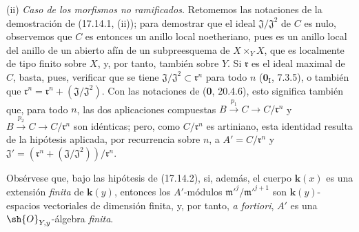 (ii) \emph{Caso de los morfismos no ramificados.} Retomemos las notaciones de la demostración de (17.14.1, (ii)); para demostrar que el ideal $\mathfrak{J}/\mathfrak{J}^2$ de $C$ es nulo, observemos que $C$ es entonces un anillo local noetheriano, pues es un anillo local del anillo de un abierto afín de un subpreesquema de $X\times_YX$, que es localmente de tipo finito sobre $X$, y, por tanto, también sobre $Y$. Si $\mathfrak r$ es el ideal maximal de $C$, basta, pues, verificar que se tiene $\mathfrak{J}/\mathfrak{J}^2\subset\mathfrak r^n$ para todo $n$ ($\mathbf{0}_{\mathrm I}$, 7.3.5), o también que $\mathfrak r^n=\mathfrak r^n+(\mathfrak{J}/\mathfrak{J}^2)$. Con las notaciones de (\textbf 0, 20.4.6), esto significa también que, para todo $n$, las dos aplicaciones compuestas $B\xrightarrow{p_1}C\to C/\mathfrak r^n$ y $B\xrightarrow{p_2}C\to C/\mathfrak r^n$ son idénticas; pero, como $C/\mathfrak r^n$ es artiniano, esta identidad resulta de la hipótesis aplicada, por recurrencia sobre $n$, a $A'=C/\mathfrak r^n$ y $\mathfrak{J}'=(\mathfrak r^n+(\mathfrak{J}/\mathfrak{J}^2))/\mathfrak r^n$.

\begin{remark}[17.14.3]
\label{IV.17.14.3}
Obsérvese que, bajo las hipótesis de (17.14.2), si, además, el cuerpo $\boldsymbol k(x)$ es una extensión \emph{finita} de $\boldsymbol k(y)$, entonces los $A'$-módulos $\mathfrak m'^j/\mathfrak m'^{j+1}$ son $\boldsymbol k(y)$-espacios vectoriales de dimensión finita, y, por tanto, \emph{a fortiori}, $A'$ es una $\sh{O}_{Y,y}$-álgebra \emph{finita}.
\end{remark}
